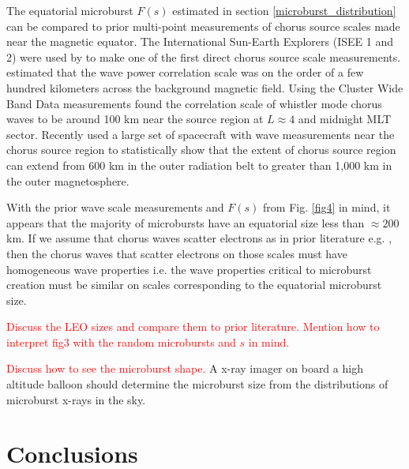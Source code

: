 \documentclass[draft]{agujournal2019}
\begin{document}
The equatorial microburst $F(s)$ estimated in section \ref{microburst_distribution} can be compared to prior multi-point measurements of chorus source scales made near the magnetic equator. The International Sun-Earth Explorers (ISEE 1 and 2) were used by  to make one of the first direct chorus source scale measurements.  estimated that the wave power correlation scale was on the order of a few hundred kilometers across the background magnetic field. Using the Cluster Wide Band Data measurements  found the correlation scale of whistler mode chorus waves to be around 100 km near the source region at $L \approx 4$ and midnight MLT sector. Recently  used a large set of spacecraft with wave measurements near the chorus source region to statistically show that the extent of chorus source region can extend from 600 km in the outer radiation belt to greater than 1,000 km in the outer magnetosphere. 

With the prior wave scale measurements and $F(s)$ from Fig. \ref{fig4} in mind, it appears that the majority of microbursts have an equatorial size less than $\approx 200$ km. If we assume that chorus waves scatter electrons as in prior literature e.g. \cite{Lorentzen2001a, Breneman2017}, then the chorus waves that scatter electrons on those scales must have homogeneous wave properties i.e. the wave properties critical to microburst creation must be similar on scales corresponding to the equatorial microburst size.

\textcolor{red}{Discuss the LEO sizes and compare them to prior literature. Mention how to interpret fig3 with the random microbursts and $s$ in mind.}

\textcolor{red}{Discuss how to see the microburst shape.}
A x-ray imager on board a high altitude balloon should determine the microburst size from the distributions of microburst x-rays in the sky.

\section{Conclusions}


\end{document}
